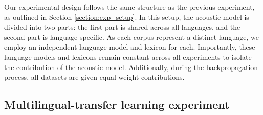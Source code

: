 Our experimental design follows the same structure as the previous experiment, as outlined in Section \ref{section:exp_setup}. In this setup, the acoustic model is divided into two parts: the first part is shared across all languages, and the second part is language-specific. As each corpus represent a distinct language, we employ an independent language model and lexicon for each. Importantly, these language models and lexicons remain constant across all experiments to isolate the contribution of the acoustic model. Additionally, during the backpropagation process, all datasets are given equal weight contributions. 

\subsection{Multilingual-transfer learning experiment}

